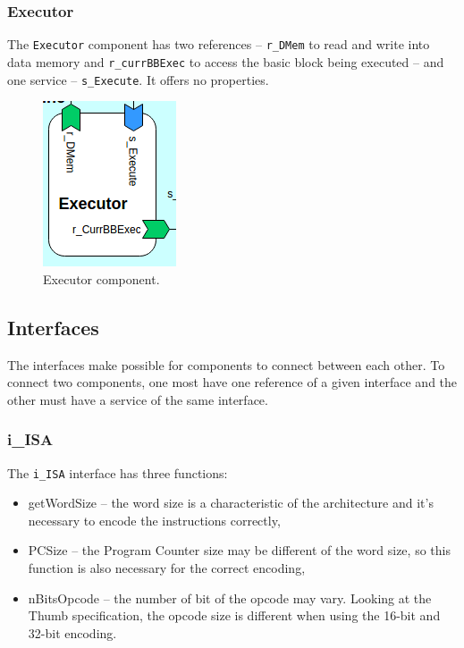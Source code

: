 \documentclass[11pt]{report}
\begin{document}
			\subsubsection{Executor}
			
			\par The \texttt{Executor} component has two references -- \texttt{r\_DMem} to read and write into data memory and \texttt{r\_currBBExec} to access the basic block being executed -- and one service -- \texttt{s\_Execute}. It offers no properties.

			\begin{figure} [H]
				\centering
				\includegraphics[width=0.3\linewidth]{Images/arch-ref/Executor}
				\caption{Executor component.}
				\label{fig:Executor}
			\end{figure}
			
		\subsection{Interfaces}\label{sec:interfaces}
		
		\par The interfaces make possible for components to connect between each other. To connect two components, one most have one reference of a given interface and the other must have a service of the same interface.

			\subsubsection*{i\_ISA}
			
			\par The \texttt{i\_ISA} interface has three functions:
			\begin{itemize}
				\item getWordSize -- the word size is a characteristic of the architecture and it's necessary to encode the instructions correctly,
				\item PCSize -- the Program Counter size may be different of the word size, so this function is also necessary for the correct encoding,
				\item nBitsOpcode -- the number of bit of the opcode may vary. Looking at the Thumb specification, the opcode size is different when using the 16-bit and 32-bit encoding. 
			\end{itemize}
			
\end{document}
